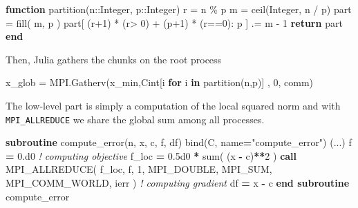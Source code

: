 \documentclass[11pt]{article}
\newenvironment{Shaded}{}{}
\newcommand{\KeywordTok}[1]{\textcolor[rgb]{0.00,0.44,0.13}{\textbf{{#1}}}}
\newcommand{\DataTypeTok}[1]{\textcolor[rgb]{0.56,0.13,0.00}{{#1}}}
\newcommand{\DecValTok}[1]{\textcolor[rgb]{0.25,0.63,0.44}{{#1}}}
\newcommand{\FloatTok}[1]{\textcolor[rgb]{0.25,0.63,0.44}{{#1}}}
\newcommand{\StringTok}[1]{\textcolor[rgb]{0.25,0.44,0.63}{{#1}}}
\newcommand{\CommentTok}[1]{\textcolor[rgb]{0.38,0.63,0.69}{\textit{{#1}}}}
\newcommand{\FunctionTok}[1]{\textcolor[rgb]{0.02,0.16,0.49}{{#1}}}
\newcommand{\NormalTok}[1]{{#1}}
\newcommand{\OperatorTok}[1]{\textcolor[rgb]{0.40,0.40,0.40}{{#1}}}
\begin{document}
\begin{Shaded}
\begin{Highlighting}[]
\KeywordTok{function}\NormalTok{ partition(n}\OperatorTok{::}\DataTypeTok{Integer}\OperatorTok{,}\NormalTok{ p}\OperatorTok{::}\DataTypeTok{Integer}\NormalTok{)}
\NormalTok{ r }\OperatorTok{=}\NormalTok{ n \% p}
\NormalTok{ m }\OperatorTok{=}\NormalTok{ ceil(}\DataTypeTok{Integer}\OperatorTok{,}\NormalTok{ n }\OperatorTok{/}\NormalTok{ p)}
\NormalTok{ part }\OperatorTok{=}\NormalTok{ fill( m}\OperatorTok{,}\NormalTok{ p )}
\NormalTok{ part[ (r}\OperatorTok{+}\FloatTok{1}\NormalTok{) }\OperatorTok{*}\NormalTok{ (r}\OperatorTok{\textgreater{}} \FloatTok{0}\NormalTok{) }\OperatorTok{+}\NormalTok{ (p}\OperatorTok{+}\FloatTok{1}\NormalTok{) }\OperatorTok{*}\NormalTok{ (r}\OperatorTok{==}\FloatTok{0}\NormalTok{)}\OperatorTok{:}\NormalTok{ p ] .}\OperatorTok{=}\NormalTok{ m }\OperatorTok{{-}} \FloatTok{1}
 \KeywordTok{return}\NormalTok{ part}
\KeywordTok{end}
\end{Highlighting}
\end{Shaded}

Then, Julia gathers the chunks on the root process

\begin{Shaded}
\begin{Highlighting}[]
\NormalTok{x\_glob }\OperatorTok{=}\NormalTok{ MPI.Gatherv(x\_min}\OperatorTok{,}\DataTypeTok{Cint}\NormalTok{[i }\KeywordTok{for}\NormalTok{ i }\KeywordTok{in}\NormalTok{ partition(n}\OperatorTok{,}\NormalTok{p)] }\OperatorTok{,} \FloatTok{0}\OperatorTok{,}\NormalTok{ comm)}
\end{Highlighting}
\end{Shaded}

The low-level part is simply a computation of the local squared norm
and with \texttt{MPI\_ALLREDUCE} we share the global sum among all
processes.

\begin{Shaded}
\begin{Highlighting}[]
\KeywordTok{subroutine}\NormalTok{ compute\_error(n, x, c, f, df) bind(C, name}\KeywordTok{=}\StringTok{"compute\_error"}\NormalTok{)}
\NormalTok{(...)}
\NormalTok{  f }\KeywordTok{=} \FloatTok{0.d0}
  \CommentTok{! computing objective}
\NormalTok{  f\_loc }\KeywordTok{=} \FloatTok{0.5d0} \KeywordTok{*} \FunctionTok{sum}\NormalTok{( (x }\KeywordTok{{-}}\NormalTok{ c)}\KeywordTok{**}\DecValTok{2}\NormalTok{ )}
  \KeywordTok{call}\NormalTok{ MPI\_ALLREDUCE( f\_loc, f, }\DecValTok{1}\NormalTok{, MPI\_DOUBLE, MPI\_SUM, MPI\_COMM\_WORLD, ierr )}
  \CommentTok{! computing gradient}
\NormalTok{  df }\KeywordTok{=}\NormalTok{ x }\KeywordTok{{-}}\NormalTok{ c}
\KeywordTok{end subroutine}\NormalTok{ compute\_error}
\end{Highlighting}
\end{Shaded}
\end{document}
